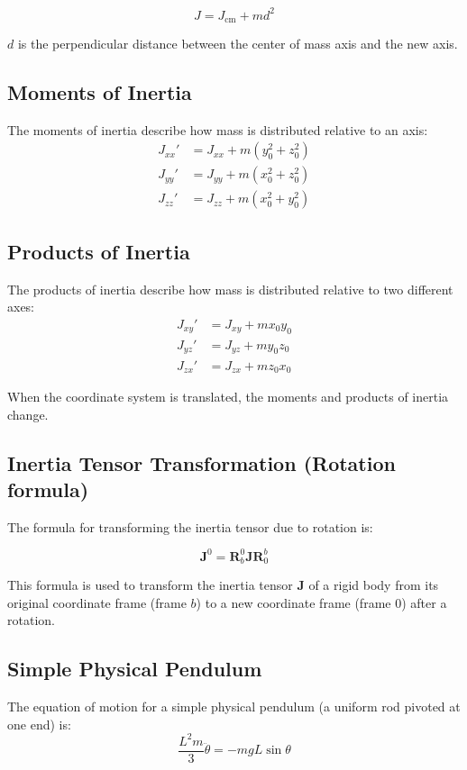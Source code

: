 \[
J = J_{\text{cm}} + m d^2
\]

$d$ is the perpendicular distance between the center of mass axis and the new axis.

\subsection{Moments of Inertia}
The moments of inertia describe how mass is distributed relative to an axis:
\begin{align*}
    J_{xx}' &= J_{xx} + m (y_0^2 + z_0^2) \\
    J_{yy}' &= J_{yy} + m (x_0^2 + z_0^2) \\
    J_{zz}' &= J_{zz} + m (x_0^2 + y_0^2)
\end{align*}

\subsection{Products of Inertia}
The products of inertia describe how mass is distributed relative to two different axes:
\begin{align*}
    J_{xy}' &= J_{xy} + m x_0 y_0 \\
    J_{yz}' &= J_{yz} + m y_0 z_0 \\
    J_{zx}' &= J_{zx} + m z_0 x_0
\end{align*}

When the coordinate system is translated, the moments and products of inertia change.

\subsection{Inertia Tensor Transformation (Rotation formula)}

The formula for transforming the inertia tensor due to rotation is:

\[ \mathbf{J}^0 = \mathbf{R}^0_b \mathbf{J} \mathbf{R}^b_0 \]

This formula is used to transform the inertia tensor \(\mathbf{J}\) of a rigid body from its original coordinate frame (frame \(b\)) to a new coordinate frame (frame \(0\)) after a rotation.


\subsection{Simple Physical Pendulum}
The equation of motion for a simple physical pendulum (a uniform rod pivoted at one end) is:
\[
\frac{L^2 m}{3} \ddot{\theta} = -mgL \sin \theta
\]


